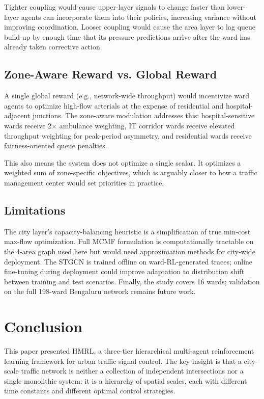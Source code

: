 \documentclass[conference]{IEEEtran}
\begin{document}
Tighter coupling would cause upper-layer signals to change faster than
lower-layer agents can incorporate them into their policies, increasing
variance without improving coordination. Looser coupling would cause the
area layer to lag queue build-up by enough time that its pressure predictions
arrive after the ward has already taken corrective action.

\subsection{Zone-Aware Reward vs. Global Reward}

A single global reward (e.g., network-wide throughput) would incentivize
ward agents to optimize high-flow arterials at the expense of residential
and hospital-adjacent junctions. The zone-aware modulation addresses this:
hospital-sensitive wards receive 2$\times$ ambulance weighting, IT corridor
wards receive elevated throughput weighting for peak-period asymmetry, and
residential wards receive fairness-oriented queue penalties.

This also means the system does not optimize a single scalar. It optimizes
a weighted sum of zone-specific objectives, which is arguably closer to how
a traffic management center would set priorities in practice.

\subsection{Limitations}

The city layer's capacity-balancing heuristic is a simplification of true
min-cost max-flow optimization. Full MCMF formulation is computationally
tractable on the 4-area graph used here but would need approximation
methods for city-wide deployment. The STGCN is trained offline on
ward-RL-generated traces; online fine-tuning during deployment could
improve adaptation to distribution shift between training and test scenarios.
Finally, the study covers 16 wards; validation on the full 198-ward
Bengaluru network remains future work.

\section{Conclusion}
\label{sec:conclusion}

This paper presented HMRL, a three-tier hierarchical multi-agent reinforcement
learning framework for urban traffic signal control. The key insight is that
a city-scale traffic network is neither a collection of independent
intersections nor a single monolithic system: it is a hierarchy of spatial
scales, each with different time constants and different optimal control
strategies.
\end{document}
